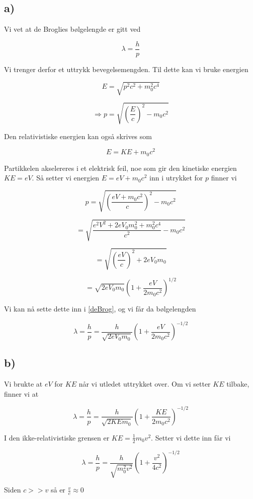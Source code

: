 \documentclass[a4paper,norsk, 10pt]{article}
\begin{document}
\subsection*{a)}
Vi vet at de Broglies bølgelengde er gitt ved

\begin{equation}
\lambda = \frac{h}{p}
\label{deBrog}
\end{equation}

Vi trenger derfor et uttrykk bevegelsemengden. Til dette kan vi bruke energien

$$
E = \sqrt{p^2c^2 + m_0^2c^4}
$$

$$
\Rightarrow p = \sqrt{\left(\frac{E}{c}\right)^2 -m_0c^2}
$$

Den relativistiske energien kan også skrives som

$$
E = KE + m_0c^2
$$

Partikkelen akselereres i et elektrisk feil, noe som gir den kinetiske energien $KE = eV$. Så setter vi energien $E = eV + m_0c^2$ inn i utrykket for $p$ finner vi

$$
p = \sqrt{\left(\frac{eV + m_0c^2}{c}\right)^2 -m_0c^2}
$$

$$
= \sqrt{\frac{e^2V^2 +2eV_0m_0^2 + m_0^2c^4}{c^2} - m_0c^2}
$$

$$
= \sqrt{\left(\frac{eV}{c}\right)^2 + 2eV_0m_0}
$$

$$
= \sqrt{2eV_0m_0}\left(1+\frac{eV}{2m_0c^2}\right)^{1/2}
$$

Vi kan nå sette dette inn i \ref{deBrog}, og vi får da bølgelengden

\begin{equation}
\lambda = \frac{h}{p} = \frac{h}{\sqrt{2eV_0m_0}}\left(1+\frac{eV}{2m_0c^2}\right)^{-1/2}
\end{equation}

\subsection*{b)}
Vi brukte at $eV$ for $KE$ når vi utledet uttrykket over. Om vi setter $KE$ tilbake, finner vi at 

$$
\lambda = \frac{h}{p} = \frac{h}{\sqrt{2KEm_0}}\left(1+\frac{KE}{2m_0c^2}\right)^{-1/2}
$$

I den ikke-relativistiske grensen er $KE = \frac{1}{2}m_0v^2$. Setter vi dette inn får vi

$$
\lambda = \frac{h}{p} = \frac{h}{\sqrt{m_0^2v^2}}\left(1+\frac{v^2}{4c^2}\right)^{-1/2}
$$

Siden $c>>v$ så er $\frac{v}{c}\approx 0$
\end{document}
